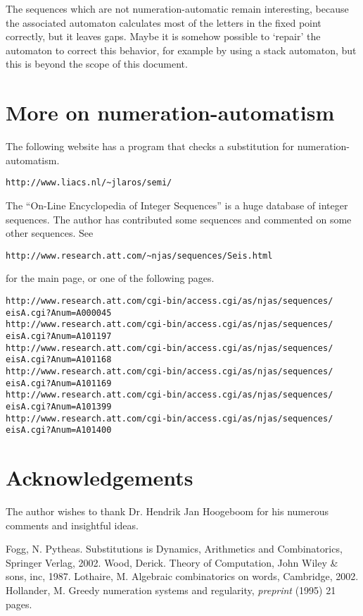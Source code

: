 \documentclass{article}
\theoremstyle{definition}
\begin{document}
The sequences which are not numeration-automatic remain interesting, because 
the associated automaton calculates most of the letters in the fixed point 
correctly, but it leaves gaps.  Maybe it is somehow possible to `repair' the 
automaton to correct this behavior, for example by using a stack automaton, 
but this is beyond the scope of this document.

\section{More on numeration-automatism}
The following website has a program that checks a substitution for 
numeration-automatism.
\begin{verbatim}
http://www.liacs.nl/~jlaros/semi/
\end{verbatim}

The ``On-Line Encyclopedia of Integer Sequences'' is a huge database of integer
sequences. The author has contributed some sequences and commented on some
other sequences. See
\begin{verbatim}
http://www.research.att.com/~njas/sequences/Seis.html
\end{verbatim}

for the main page, or one of the following pages.
\begin{verbatim}
http://www.research.att.com/cgi-bin/access.cgi/as/njas/sequences/
eisA.cgi?Anum=A000045
http://www.research.att.com/cgi-bin/access.cgi/as/njas/sequences/
eisA.cgi?Anum=A101197
http://www.research.att.com/cgi-bin/access.cgi/as/njas/sequences/
eisA.cgi?Anum=A101168
http://www.research.att.com/cgi-bin/access.cgi/as/njas/sequences/
eisA.cgi?Anum=A101169
http://www.research.att.com/cgi-bin/access.cgi/as/njas/sequences/
eisA.cgi?Anum=A101399
http://www.research.att.com/cgi-bin/access.cgi/as/njas/sequences/
eisA.cgi?Anum=A101400
\end{verbatim}

\section{Acknowledgements}
The author wishes to thank Dr. Hendrik Jan Hoogeboom for his numerous comments
and insightful ideas.


\begin{thebibliography}{XX}
 Fogg, N. Pytheas. Substitutions is Dynamics, Arithmetics and
               Combinatorics, Springer Verlag, 2002.
 Wood, Derick. Theory of Computation, John Wiley \& sons, inc, 
               1987.
 Lothaire, M. Algebraic combinatorics on words, Cambridge, 2002.
 Hollander, M. Greedy numeration systems and regularity,
              \emph{preprint} (1995) 21 pages.
\end{thebibliography}
\end{document}
